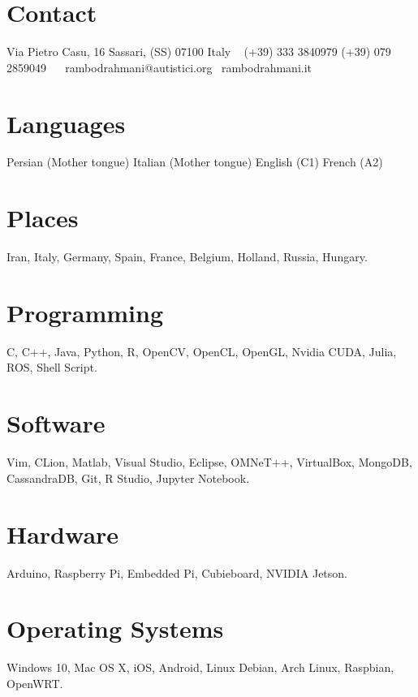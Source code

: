 \documentclass[]{friggeri-cv}
\begin{document}


\begin{aside}
\vspace{-1.0cm}
\section{Contact}
Via Pietro Casu, 16
Sassari, (SS) 07100
Italy
~
(+39) 333 3840979
(+39) 079 2859049
~
\small{\hspace{-1.0cm}{\faEnvelope}~{rambodrahmani@autistici.org}}
\small{{\faGlobe}~{rambodrahmani.it}}\vspace{6mm}
\section{Languages}
Persian (Mother tongue)
Italian (Mother tongue)
English (C1)
French (A2)\vspace{6mm}
\section{Places \textcolor{light-blue}{\faMapMarker}}
Iran, Italy, Germany, Spain, France, Belgium, Holland, Russia, Hungary.\vspace{6mm}
\section{Programming \small{\textcolor{magenta}{{\faHeart}}}}
C, C++, Java, Python, R, OpenCV, OpenCL, OpenGL, Nvidia CUDA, Julia, ROS, Shell Script.\vspace{6mm}
\section{Software}
Vim, CLion, Matlab, Visual Studio, Eclipse, OMNeT++, VirtualBox, MongoDB, CassandraDB, Git, R Studio, Jupyter Notebook.\vspace{6mm}
\section{Hardware}
Arduino, Raspberry Pi, Embedded Pi, Cubieboard, NVIDIA Jetson.\vspace{6mm}
\section{Operating Systems \textcolor{orange}{\faLinux}}
Windows 10, Mac OS X, iOS, Android, Linux Debian, Arch Linux, Raspbian, OpenWRT.\vspace{6mm}
\end{aside}
\end{document}

